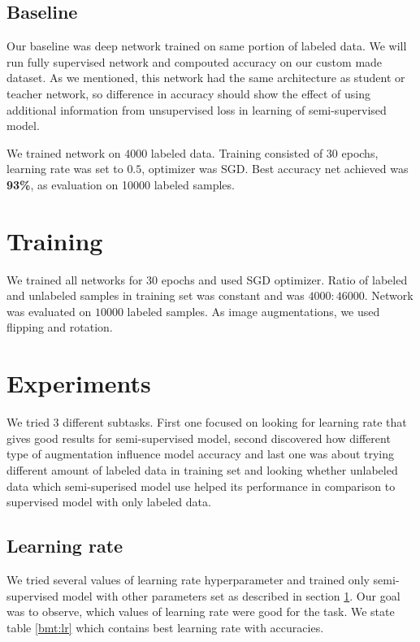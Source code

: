 \subsection{Baseline}
Our baseline was deep network trained on same portion of labeled data. We will run fully supervised network and compouted accuracy on our custom made dataset. As we mentioned, this network had the same architecture as student or teacher network, so difference in accuracy should show the effect of using additional information from unsupervised loss in learning of semi-supervised model. 

We trained network on $4000$ labeled data. Training consisted of 30 epochs, learning rate was set to $0.5$, optimizer was SGD. Best accuracy net achieved was \textbf{93\%}, as evaluation on 10000 labeled samples.


\section{Training}
\label{bmt:training}
We trained all networks for 30 epochs and used SGD optimizer. Ratio of labeled and unlabeled samples in training set was constant and was $4000:46000$. Network was evaluated on $10000$ labeled samples. As image augmentations, we used  flipping and rotation.

\section{Experiments}

We tried 3 different subtasks. First one focused on looking for learning rate that gives good results for semi-supervised model, second discovered how different type of augmentation influence model accuracy and last one was about trying different amount of labeled data in training set and looking whether unlabeled data which semi-superised model use helped its performance in comparison to supervised model with only labeled data.


\subsection{Learning rate}
We tried several values of learning rate hyperparameter and trained only semi-supervised model with other parameters set as described in section \ref{bmt:training}. Our goal was to observe, which values of learning rate were good for the task. We state table \ref{bmt:lr} which contains best learning rate with accuracies.

